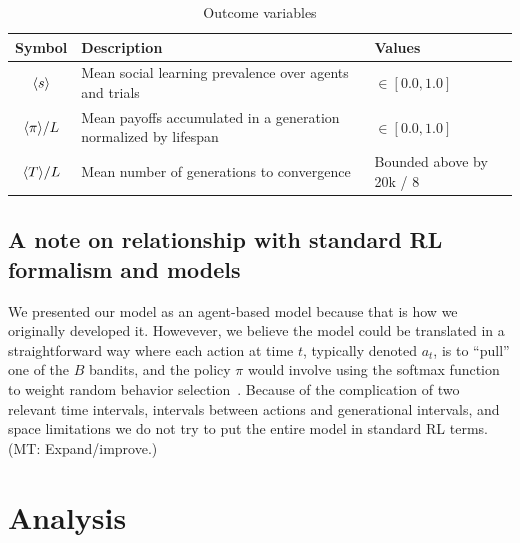 \documentclass[letterpaper,11.5pt]{scrartcl}
\newcommand{\mt}[1]{{\textcolor{myorange} {({\tiny MT:} #1)}}}
\begin{document}
\begin{table}[h]
    \caption{Outcome variables}
    \label{tab:outcomeVariables}
    \centering %
    \begin{tabular}{cp{2.5in}p{1in}} \toprule

        Symbol & Description & Values \\ 

        \midrule  

        $\langle s \rangle$ & Mean social learning prevalence over agents and trials
                  & $\in [0.0, 1.0]$ \\

        $\langle \pi \rangle / L$ & Mean payoffs accumulated in a generation normalized by
        lifespan & $\in [0.0, 1.0]$ \\

        $\langle T \rangle / L$ & Mean number of generations to convergence & Bounded above by 20k / 8\\
        \bottomrule
    \end{tabular}
\end{table}


\subsection{A note on relationship with standard RL formalism and models}

We presented our model as an agent-based model because that is
how we originally developed it. Howevever, we believe the model could be 
translated in a straightforward way where each action at time $t$, typically denoted
$a_t$, is to ``pull'' one of the $B$ bandits, and the policy $\pi$ would 
involve using the softmax function to weight random behavior
selection~\cite{SuttonBartoBook}. Because of the complication of two
relevant time intervals, intervals between actions and generational intervals, and
space limitations we do not try to put the entire model in standard RL terms.
\mt{Expand/improve.}

\section{Analysis}
\end{document}
